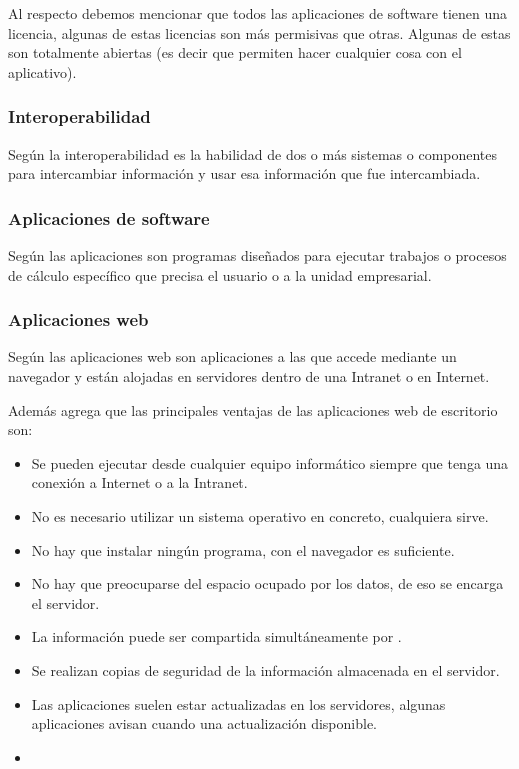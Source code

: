 Al respecto debemos mencionar que todos las aplicaciones de software tienen una
licencia, algunas de estas licencias son m\'as permisivas que otras. Algunas de estas
son totalmente abiertas (es decir que permiten hacer cualquier cosa con el aplicativo).
\subsubsection{Interoperabilidad}
Seg\'un \cite{kajan} la interoperabilidad es la habilidad de dos o m\'as sistemas o
componentes para intercambiar informaci\'on y usar esa informaci\'on que fue intercambiada.
\subsubsection{Aplicaciones de software}

Seg\'un \cite{pablos} las aplicaciones son programas dise\~nados para ejecutar
trabajos o procesos de c\'alculo espec\'ifico que precisa el usuario o a la unidad
empresarial.
\subsubsection{Aplicaciones web}
Seg\'un \cite{nino} las aplicaciones web son aplicaciones a las que accede mediante un
navegador y est\'an alojadas en servidores dentro de una Intranet o en Internet.

Adem\'as \cite{nino} agrega que las principales ventajas de las aplicaciones web de
escritorio son:
\begin{itemize}
    \item Se pueden ejecutar desde cualquier equipo inform\'atico siempre que tenga
          una conexi\'on a Internet o a la Intranet.
    \item No es necesario utilizar un sistema operativo en concreto, cualquiera sirve.
    \item No hay que instalar ning\'un programa, con el navegador es suficiente.
    \item No hay que preocuparse del espacio ocupado por los datos, de eso se encarga
          el servidor.
    \item La informaci\'on puede ser compartida simult\'aneamente por .
    \item Se realizan copias de seguridad de la informaci\'on almacenada en el servidor.
    \item Las aplicaciones suelen estar actualizadas en los servidores, algunas
          aplicaciones avisan cuando una actualizaci\'on disponible.
    \item
\end{itemize}

